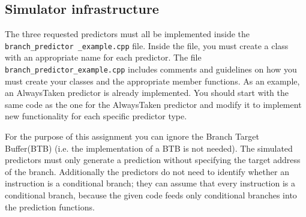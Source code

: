 \documentclass[a4paper,12pt]{article}
\theoremstyle{plain}
\begin{document}
\begin{itemize}
 
 
 
 \end{itemize}


\subsection{Simulator infrastructure} \label{guide}
The three requested predictors must all be implemented inside the \texttt{branch\_predictor \_example.cpp} file. Inside the file, you must create a class with an appropriate name for each predictor. The file \texttt{branch\_predictor\_example.cpp} includes comments and guidelines on how you must create your classes and the appropriate member functions. As an example, an AlwaysTaken predictor is already implemented. You should start with the same code as the one for the AlwaysTaken predictor and modify it to implement new functionality for each specific predictor type.

For the purpose of this assignment you can ignore the Branch Target Buffer(BTB) (i.e. the implementation of a BTB is not needed). The simulated predictors must only generate a prediction without specifying the target address of the branch. Additionally the predictors do not need to identify whether an instruction is a conditional branch; they can assume that every instruction is a conditional branch, because the given code feeds only conditional branches into the prediction functions.
\end{document}
